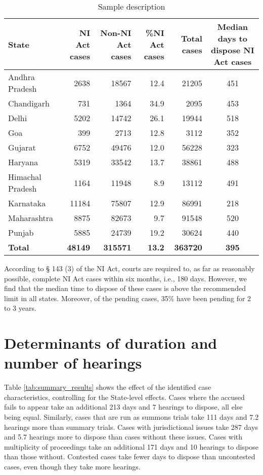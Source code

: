 \documentclass[11pt,a4paper]{article}
\begin{document}
{\footnotesize \begin{longtable}{@{}lrrrr|c@{}}
\caption{Sample description}
\label{tab:sample_desc}\\
\toprule
\textbf{State} & \multicolumn{1}{p{1.5cm}}{\textbf{NI Act cases}} & \multicolumn{1}{p{1.5cm}}{\textbf{Non-NI Act cases}} & \multicolumn{1}{p{1.5cm}}{\textbf{\%NI Act cases}} & \textbf{Total cases} & \multicolumn{1}{p{3cm}}{\textbf{Median days to dispose NI Act cases}}\\ \midrule
\endhead
Andhra Pradesh & 2638 & 18567 & 12.4 & 21205 & 451\\
Chandigarh & 731 & 1364 & 34.9 & 2095 & 453\\
Delhi & 5202 & 14742 & 26.1 & 19944 & 518\\
Goa & 399 & 2713 & 12.8 & 3112 & 352\\
Gujarat & 6752 & 49476 & 12.0 & 56228 & 323\\
Haryana & 5319 & 33542 & 13.7 & 38861 & 488\\
Himachal Pradesh & 1164 & 11948 & 8.9 & 13112 & 491\\
Karnataka & 11184 & 75807 & 12.9 & 86991 & 218\\
Maharashtra & 8875 & 82673 & 9.7 & 91548 & 520\\
Punjab & 5885 & 24739 & 19.2 & 30624 & 440\\
\midrule
\textbf{Total} & \textbf{48149} & \textbf{315571} & \textbf{13.2} & \textbf{363720} & \textbf{395}\\ \bottomrule
\end{longtable}
}

According to § 143 (3) of the NI Act, courts are required to, as far as reasonably possible, complete NI Act cases within six months, i.e., 180 days. However, we find that the median time to dispose of these cases is above the recommended limit in all states. Moreover, of the pending cases, 35\% have been pending for 2 to 3 years.

\section{Determinants of duration and number of hearings}

Table \ref{tab:summary_results} shows the effect of the identified case characteristics, controlling for the State-level effects. Cases where the accused fails to appear take an additional 213 days and 7 hearings to dispose, all else being equal. Similarly, cases that are run as summons trials take 111 days and 7.2 hearings more than summary trials. Cases with jurisdictional issues take 287 days and 5.7 hearings more to dispose than cases without these issues. Cases with multiplicity of proceedings take an additional 171 days and 10 hearings to dispose than those without. Contested cases take fewer days to dispose than uncontested cases, even though they take more hearings.
\end{document}
